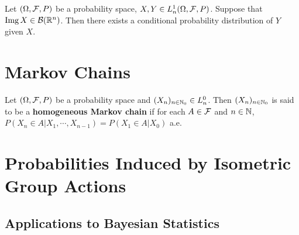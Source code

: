 \documentclass{book}
\begin{document}
	\begin{thm}
	Let $(\Omega, \mathcal{F}, P)$ be a probability space, $X,Y \in L_n^1(\Omega, \mathcal{F}, P)$. Suppose that $\text{Img} \, X \in \mathcal{B}(\mathbb{R}^n)$. Then there exists a conditional probability distribution of $Y$ given $X$. 
	\end{thm}
	
	
	
	
	
	
	
	
	
	
	
	
	
	
	\newpage
	\chapter{Markov Chains}	

	\begin{defn}
	\end{defn}
	
	\begin{defn}
	Let $(\Omega, \mathcal{F}, P)$ be a probability space and $(X_n)_{n \in \mathbb{N}_0} \in L_n^0$. Then $(X_n)_{n \in \mathbb{N}_0}$ is said to be a \textbf{homogeneous Markov chain} if for each $A \in \mathcal{F}$ and $n \in \mathbb{N}$, $P(X_n \in A| X_1, \cdots, X_{n-1}) = P(X_1 \in A| X_{0})$ a.e. 
	\end{defn}
	
	
	
	
	
	
	
	
	
	
	
	
	
	
	
	
	
	
	
	
	
	
	
	\newpage
	\chapter{Probabilities Induced by Isometric Group Actions}
	
	\section{Applications to Bayesian Statistics}
	
\end{document}
